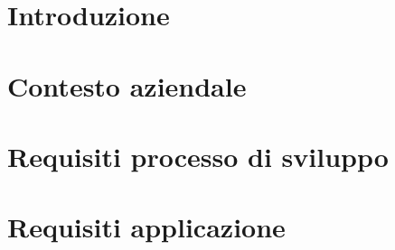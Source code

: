 
\section{Introduzione}

\section{Contesto aziendale}

\section{Requisiti processo di sviluppo}



\section{Requisiti applicazione}
